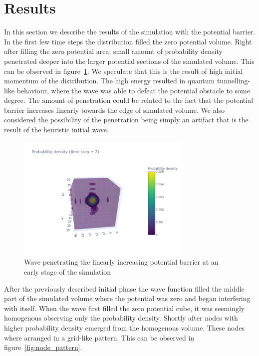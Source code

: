 \section{Results}

In this section we describe the results of the simulation with the potential barrier.
In the first few time steps the distribution filled the zero potential volume.
Right after filling the zero potential area, small amount of probability density penetrated deeper into the larger potential sections of the simulated volume.
This can be observed in figure~\ref{fig:penetrating_potential}.
We speculate that this is the result of high initial momentum of the distribution.
The high energy resulted in quantum tunnelling-like behaviour, where the wave was able to defeat the potential obstacle to some degree.
The amount of penetration could be related to the fact that the potential barrier increases linearly towards the edge of simulated volume.
We also considered the possibility of the penetration being simply an artifact that is the result of the heuristic initial wave.

\begin{figure}
	\includegraphics[width=0.75\textwidth]{"figures/probability_density007.jpeg"}
	\caption{Wave penetrating the linearly increasing potential barrier at an early stage of the simulation}
	\label{fig:penetrating_potential}
\end{figure}

After the previously described initial phase the wave function filled the middle part of the simulated volume where the potential was zero and began interfering with itself.
When the wave first filled the zero potential cube, it was seemingly homogenous observing only the probability density.
Shortly after nodes with higher probability density emerged from the homogenous volume.
These nodes where arranged in a grid-like pattern.
This can be observed in figure~\ref{fig:node_pattern}.

